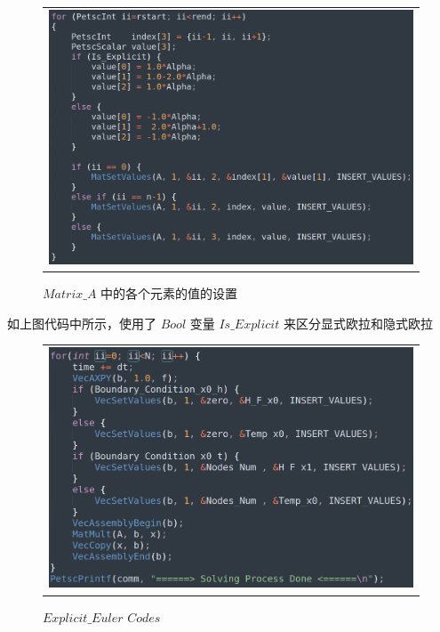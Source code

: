 \documentclass[3p]{elsarticle}
\numberwithin{equation}{section}
\begin{document}
    \begin{figure}[h]
    	\begin{center}
    		\begin{tabular}{c}
    			\includegraphics[angle=0, scale=0.18]{./figures/matrix_each_value.png}
    		\end{tabular}
    	\end{center}
    	\caption{$ Matrix\_A $ 中的各个元素的值的设置}
    	\label{fig:illustration-matrix_each_value}
    \end{figure}

    如上图代码中所示，使用了 $ Bool $ 变量 $ Is\_Explicit $ 来区分显式欧拉和隐式欧拉
    
    \begin{figure}[h]
    	\begin{center}
    		\begin{tabular}{c}
    			\includegraphics[angle=0, scale=0.205]{./figures/Explicit_Euler.png}
    		\end{tabular}
    	\end{center}
    	\caption{$ Explicit\_Euler $ $ Codes $}
    	\label{fig:illustration-Explicit_Euler}
    \end{figure}
    
\end{document}

